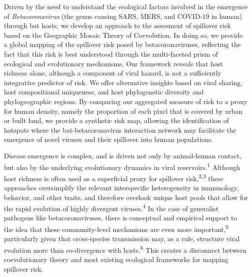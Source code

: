 \documentclass[11pt]{article}
\begin{document}
\vfill
Driven by the need to understand the ecological factors involved in the
emergence of \emph{Betacoronavirus} (the genus causing SARS, MERS, and
COVID-19 in human) through bat hosts, we develop an approach to the
assesment of spillover risk based on the Geographic Mosaic Theory of
Coevolution. In doing so, we provide a global mapping of the spillover
risk posed by betacoronaviruses, reflecting the fact that this risk is
best understood through the multi-faceted prism of ecological and
evolutionary mechanisms. Our framework reveals that host richness alone,
although a component of viral hazard, is not a sufficiently integrative
predictor of risk. We offer alternative insights based on viral sharing,
host compositional uniqueness, and host phylogenetic diversity and
phylogeographic regions. By comparing our aggregated measure of risk to
a proxy for human density, namely the proportion of each pixel that is
covered by urban or built land, we provide a synthetic risk map,
allowing the identification of hotspots where the bat-betacoronavirus
interaction network may facilitate the emergence of novel viruses and
their spillover into human populations.



\vfill

\clearpage
\linenumbers
\pagestyle{normal}

Disease emergence is complex, and is driven not only by animal-human
contact, but also by the underlying evolutionary dynamics in viral
reservoirs.\textsuperscript{1} Although host richness is often used as a
superficial proxy for spillover risk,\textsuperscript{2,3} these
approaches oversimplify the relevant interspecific heterogeneity in
immunology, behavior, and other traits, and therefore overlook unique
host pools that allow for the rapid evolution of highly divergent
viruses.\textsuperscript{4} In the case of generalist pathogens like
betacoronaviruses, there is conceptual and empirical support to the idea
that these community-level mechanisms are even more
important,\textsuperscript{5} particularly given that cross-species
transmission may, as a rule, structure viral evolution more than
co-divergence with hosts.\textsuperscript{6} This creates a disconnect
between coevolutionary theory and most existing ecological frameworks
for mapping spillover risk.
\end{document}
